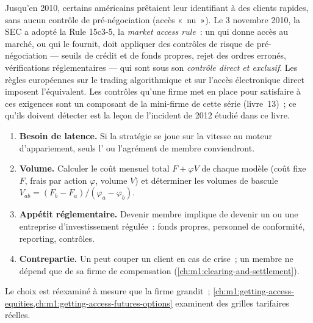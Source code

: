 \begin{remark}\label{rem:m1:exchanges-brokers-venues:15c35}
Jusqu'en 2010, certains  américains prêtaient leur identifiant à des clients rapides,
sans aucun contrôle de pré-négociation (accès «~nu~»). Le 3 novembre 2010, la SEC a adopté
la Rule 15c3-5, la \emph{market access rule}~: un  qui donne accès au marché,
ou qui le fournit, doit appliquer des contrôles de risque de pré-négociation --- seuils de
crédit et de fonds propres, rejet des ordres erronés, vérifications réglementaires --- qui
sont sous son \emph{contrôle direct et exclusif}. Les règles européennes sur le trading
algorithmique et sur l'accès électronique direct imposent l'équivalent. Les contrôles qu'une
firme met en place pour satisfaire à ces exigences sont un composant de la mini-firme de cette
série (livre~13)~; ce qu'ils doivent détecter est la leçon de l'incident de 2012
étudié dans ce livre.
\end{remark}

\begin{method}\label{met:m1:exchanges-brokers-venues:choose}
\begin{enumerate}
\item \textbf{Besoin de latence.} Si la stratégie se joue sur la vitesse au
  moteur d'appariement, seuls l' ou l'agrément de membre conviendront.
\item \textbf{Volume.} Calculer le coût mensuel total
  $F + \varphi V$ de chaque modèle (coût fixe $F$, frais par action $\varphi$,
  volume $V$) et déterminer les volumes de bascule $V_{ab} = (F_b - F_a)/(\varphi_a
  - \varphi_b)$.
\item \textbf{Appétit réglementaire.} Devenir membre implique de devenir un  ou une
  entreprise d'investissement régulée~: fonds propres, personnel de conformité, reporting,
  contrôles.
\item \textbf{Contrepartie.} Un  peut couper un client en cas de crise~; un
  membre ne dépend que de sa firme de compensation (\cref{ch:m1:clearing-and-settlement}).
\end{enumerate}
Le choix est réexaminé à mesure que la firme grandit~;
\cref{ch:m1:getting-access-equities,ch:m1:getting-access-futures-options}
examinent des grilles tarifaires réelles.
\end{method}

